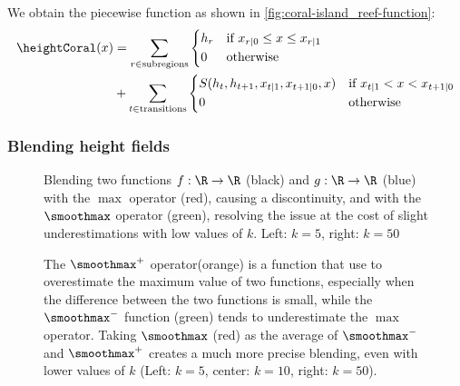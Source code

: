We obtain the piecewise function as shown in \cref{fig:coral-island_reef-function}:
\begin{align}
    \heightCoral(x) &= \sum_{r \in \text{subregions}}{
    \begin{dcases}
        h_r & \text{if } x_{r|0} \leq x \leq x_{r|1} \\
        0 & \text{otherwise}
    \end{dcases}
    } \nonumber \\ 
    &+
    \sum_{t \in \text{transitions}} {
        \begin{dcases}
            S(h_{t}, h_{t+1}, x_{t|1}, x_{t+1|0}, x) & \text{if } x_{t|1} < x < x_{t+1|0} \\
            0 & \text{otherwise}
        \end{dcases}
    }
\end{align}

\subsubsection{Blending height fields}
\label{subsubsec:height-functions-blending}

\begin{figure}[H]
    \caption{Blending two functions $f: \R \to \R$ (black) and $g: \R \to \R$ (blue) with the $\max$ operator (red), causing a discontinuity, and with the $\smoothmax$ operator (green), resolving the issue at the cost of slight underestimations with low values of $k$. Left: $k=5$, right: $k=50$}
    \label{fig:coral-island_blend-function-island}
\end{figure}

\begin{figure}[H]
    \caption{The $\smoothmax^+$ operator(orange) is a function that use to overestimate the maximum value of two functions, especially when the difference between the two functions is small, while the $\smoothmax^-$ function (green) tends to underestimate the $\max$ operator. Taking $\smoothmax$ (red) as the average of $\smoothmax^-$ and $\smoothmax^+$ creates a much more precise blending, even with lower values of $k$ (Left: $k=5$, center: $k=10$, right: $k=50$).}
    \label{fig:coral-island_blend-function-island-with-upper}
\end{figure}

